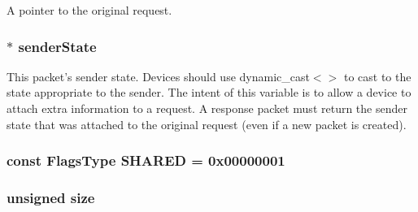 A pointer to the original request. \hypertarget{classPacket_a983ade0479f946c813284dcc65073367}{
\subsubsection[{senderState}]{$\ast$ {\bf senderState}}}
\label{classPacket_a983ade0479f946c813284dcc65073367}
This packet's sender state. Devices should use dynamic\_\-cast$<$$>$ to cast to the state appropriate to the sender. The intent of this variable is to allow a device to attach extra information to a request. A response packet must return the sender state that was attached to the original request (even if a new packet is created). \hypertarget{classPacket_a3f87955b81ea6f9d7f89d5ab033074f9}{
\subsubsection[{SHARED}]{\setlength{\rightskip}{0pt plus 5cm}const {\bf FlagsType} {\bf SHARED} = 0x00000001}}
\label{classPacket_a3f87955b81ea6f9d7f89d5ab033074f9}
\hypertarget{classPacket_a245260f6f74972558f61b85227df5aae}{
\subsubsection[{size}]{\setlength{\rightskip}{0pt plus 5cm}unsigned {\bf size}}}
\label{classPacket_a245260f6f74972558f61b85227df5aae}


